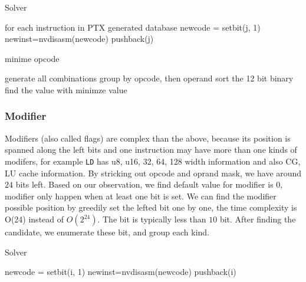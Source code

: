 \documentclass{sig-alternate-05-2015}
\begin{document}
\begin{algorithm}
      \caption{Solver}\label{opcode}
  \begin{algorithmic}[1]
      \State for each instruction in PTX generated database
      \State newcode = setbit(j, 1)
      \State newinst=nvdisasm(newcode)
      \State pushback(j)
      \EndIf
      \EndIf
      \EndFor
      \EndFor
  \end{algorithmic}
\end{algorithm}

\begin{algorithm}
      \caption{minime opcode}\label{opcode}
  \begin{algorithmic}[1]
      \State generate all combinations
      \State group by opcode, then operand
      \State sort the 12 bit binary 
      \State find the value with minimze value
  \end{algorithmic}
\end{algorithm}

\subsubsection{Modifier}
Modifiers (also called flags) are complex than the above, because its position is spanned along the left bits and one instruction may have
more than one kinds of modifers, for example {\tt LD} has u8, u16, 32, 64, 128 width information and also CG, LU cache
information. By stricking out opcode and oprand mask, we have around $24$ bits left. Based on our observation, we find
default value for modifier is $0$, modifier only happen when at least one bit is set. We can find the modifier possible position
by greedily set the lefted bit one by one, the time complexity is O(24) instead of $O(2^{24})$. The bit is typically less
than $10$ bit. After finding the candidate, we enumerate these bit, and group each kind.

\begin{algorithm}
      \caption{Solver}\label{opcode}
  \begin{algorithmic}[1]
      \State newcode = setbit(i, 1)
      \State newinst=nvdisasm(newcode)
      \State pushback(i)
      \EndIf
      \EndIf
  \end{algorithmic}
\end{algorithm}
\end{document}
